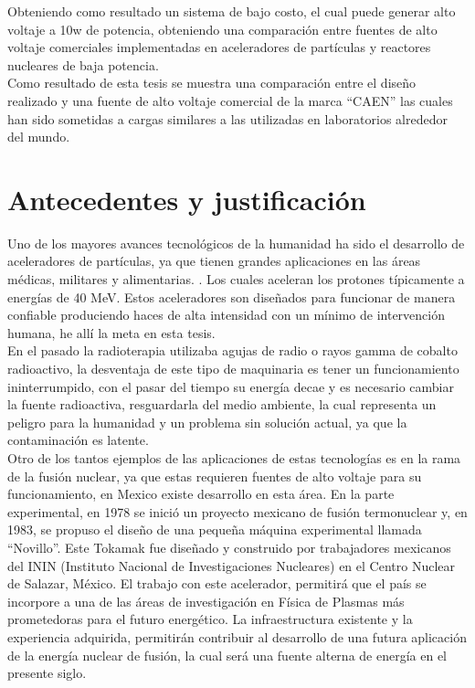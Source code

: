 Obteniendo como resultado un sistema de bajo costo, el cual puede generar alto voltaje a 10w de potencia, obteniendo una comparación entre fuentes de alto voltaje comerciales implementadas en aceleradores de partículas y reactores nucleares de baja potencia. \\

Como resultado de esta tesis se muestra una comparación entre el diseño realizado y una fuente de alto voltaje comercial de la marca ``CAEN'' las cuales han sido sometidas a cargas similares a las utilizadas en laboratorios alrededor del mundo.\newpage




\section{Antecedentes y justificación}


Uno de los mayores avances tecnológicos de la humanidad ha sido el desarrollo de aceleradores de partículas, ya que tienen grandes aplicaciones en las áreas médicas, militares y alimentarias. \cite{ProyectoLNLS5}. Los cuales aceleran los protones típicamente a energías de 40 MeV. Estos aceleradores son diseñados para funcionar de manera confiable produciendo haces de alta intensidad con un mínimo de intervención humana, he allí la meta en esta tesis.\\

En el pasado la radioterapia utilizaba agujas de radio o rayos gamma de cobalto radioactivo, la desventaja de este tipo de maquinaria es tener un funcionamiento ininterrumpido, con el pasar del tiempo su energía decae y es necesario cambiar la fuente radioactiva, resguardarla del medio ambiente, la cual representa un peligro para la humanidad y un problema sin solución actual, ya que la contaminación es latente.\\

Otro de los tantos ejemplos de las aplicaciones de estas tecnologías es en la rama de la fusión nuclear, ya que estas requieren fuentes de alto voltaje para su funcionamiento, en Mexico existe desarrollo en esta área. En la parte experimental, en 1978 se inició un proyecto mexicano de fusión termonuclear y, en 1983, se propuso el diseño de una pequeña máquina experimental llamada “Novillo”. Este Tokamak fue diseñado y construido por trabajadores mexicanos del ININ (Instituto Nacional de Investigaciones Nucleares) en el Centro Nuclear de Salazar, México. El trabajo con este acelerador, permitirá que el país se incorpore a una de las áreas de investigación en Física de Plasmas más prometedoras para el futuro energético. La infraestructura existente y la experiencia adquirida, permitirán contribuir al desarrollo de una futura aplicación de la energía nuclear de fusión, la cual será una fuente alterna de energía en el presente siglo. \\

